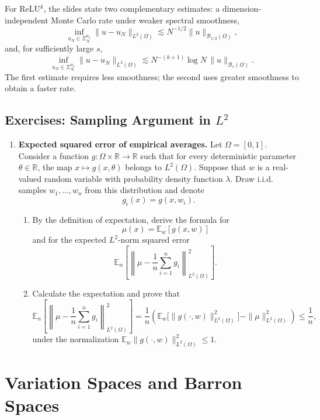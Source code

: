 \documentclass[11pt,a4paper]{article}
\theoremstyle{definition}
\theoremstyle{plain}
\theoremstyle{remark}
\theoremstyle{plain}
\begin{document}
For ReLU$^k$, the slides state two complementary estimates: a dimension-independent Monte Carlo rate under weaker spectral smoothness,
\[
  \inf_{u_N\in\Sigma_N^{\sigma_k}}
  \|u-u_N\|_{L^2(\Omega)}
  \lesssim N^{-1/2}\|u\|_{\mathcal B_{1/2}(\Omega)},
\]
and, for sufficiently large $s$,
\[
  \inf_{u_N\in\Sigma_N^{\sigma_k}}
  \|u-u_N\|_{L^2(\Omega)}
  \lesssim N^{-(k+1)}\log N\,\|u\|_{\mathcal B_s(\Omega)}.
\]
The first estimate requires less smoothness; the second uses greater smoothness to obtain a faster rate.



\subsection*{Exercises: Sampling Argument in $L^2$}
\begin{enumerate}[label=\textbf{Exercise \arabic*.},leftmargin=2.6em]
  \item \textbf{Expected squared error of empirical averages.}
  Let $\Omega=[0,1]$. Consider a function $g:\Omega\times\mathbb R\to\mathbb R$ such that for every deterministic parameter $\theta\in\mathbb R$, the map $x\mapsto g(x,\theta)$ belongs to $L^2(\Omega)$. Suppose that $w$ is a real-valued random variable with probability density function $\lambda$. Draw i.i.d. samples $w_1,\ldots,w_n$ from this distribution and denote
  \[
    g_i(x)=g(x,w_i).
  \]
  \begin{enumerate}[label=(\alph*)]
    \item By the definition of expectation, derive the formula for
    \[
      \mu(x)=\mathbb E_w[g(x,w)]
    \]
    and for the expected $L^2$-norm squared error
    \[
      \mathbb E_n\left[
      \left\|\mu-\frac1n\sum_{i=1}^n g_i\right\|_{L^2(\Omega)}^2
      \right].
    \]
    \item Calculate the expectation and prove that
    \[
      \mathbb E_n\left[
      \left\|\mu-\frac1n\sum_{i=1}^n g_i\right\|_{L^2(\Omega)}^2
      \right]
      =\frac1n\left(
      \mathbb E_w\bigl[\|g(\cdot,w)\|_{L^2(\Omega)}^2\bigr]
      -\|\mu\|_{L^2(\Omega)}^2
      \right)
      \le \frac1n,
    \]
    under the normalization $\mathbb E_w\|g(\cdot,w)\|_{L^2(\Omega)}^2\le1$.
  \end{enumerate}
\end{enumerate}

\section{Variation Spaces and Barron Spaces}
\end{document}
